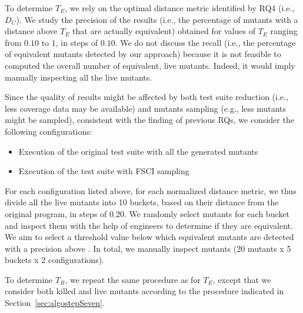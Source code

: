 To determine $T_E$, 
we rely on the optimal distance metric identified by RQ4 (i.e., {$D_C$}).
We study the precision of the results (i.e., the percentage of mutants with a distance above $T_E$ that are actually equivalent) obtained for  values of $T_E$ ranging from $0.10$ to $1$, in steps of $0.10$.
{We do not discuss the recall (i.e., the percentage of equivalent mutants detected by our approach) because it is not feasible to computed the overall number of equivalent, live mutants. Indeed, it would imply manually inspecting all the live mutants.}

Since the quality of results might be affected by both test suite reduction (i.e., less coverage data may be available) and mutants sampling (e.g., less mutants might be sampled), consistent with the finding of previous RQs, we consider the following configurations: 
\begin{itemize}
\item Execution of the original test suite with all the generated mutants
\item Execution of the \APPR test suite with FSCI sampling
\end{itemize}

For each configuration listed above, for each normalized distance metric, we thus divide all the live mutants into 10 buckets, based on their distance from the original program, in steps of $0.20$.
We randomly select  mutants for each bucket and inspect them with the help of engineers to determine if they are equivalent. 
We aim to select a threshold value below which equivalent mutants are detected with a precision above . 
In total, we manually inspect  mutants (20 mutants x 5 buckets x 2 configurations).

To determine $T_R$, we repeat the same procedure as for $T_E$, except that we consider both killed and live mutants according to the procedure indicated in Section~\ref{sec:algostepSeven}.

